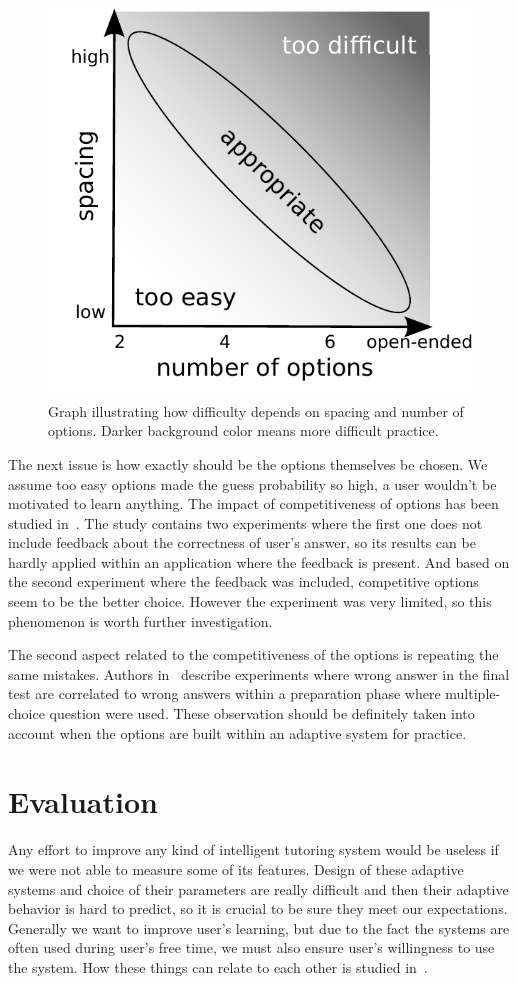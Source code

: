 \documentclass[table,color,cover,twoside,nolot,nolof]{fithesis3/fithesis3}
\begin{document}
\begin{figure}[h]
	\begin{center}
		\includegraphics[width=.5\textwidth]{figure/options_vs_spacing}
	\end{center}
	\caption{Graph illustrating how difficulty depends on spacing and number of
		options. Darker background color means more difficult practice.}
	\label{figure:options_vs_spacing}
\end{figure}

The next issue is how exactly should be the options themselves be chosen. We
assume too easy options made the guess probability so high, a user wouldn't be
motivated to learn anything. The impact of competitiveness of options has been
studied in~\cite{little2015optimizing}. The study contains two experiments
where the first one does not include feedback about the correctness of user's
answer, so its results can be hardly applied within an application where the
feedback is present. And based on the second experiment where the feedback was
included, competitive options seem to be the better choice. However the
experiment was very limited, so this phenomenon is worth further investigation.

The second aspect related to the competitiveness of the options is repeating the
same mistakes. Authors in~\cite{marsh2007memorial} describe experiments where
wrong answer in the final test are correlated to wrong answers within a
preparation phase where multiple-choice question were used. These observation
should be definitely taken into account when the options are built within an
adaptive system for practice.

\section{Evaluation}
\label{section:evaluation}

Any effort to improve any kind of intelligent tutoring system would be useless
if we were not able to measure some of its features. Design of these
adaptive systems and choice of their parameters are really difficult and then
their adaptive behavior is hard to predict, so it is crucial to be sure they
meet our expectations. Generally we want to improve user's learning, but due to
the fact the systems are often used during user's free time, we must also
ensure user's willingness to use the system. How these things can relate to each
other is studied in~\cite{lomas2013optimizing}.
\end{document}
